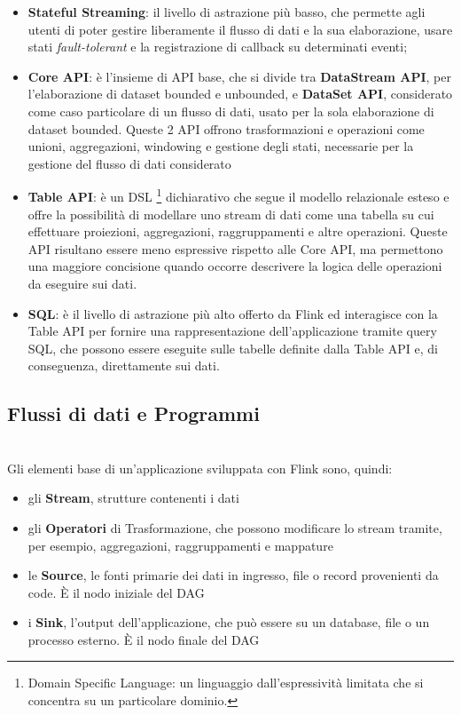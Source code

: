 \begin{itemize}
	\item \textbf{Stateful Streaming}: il livello di astrazione più basso, che permette agli utenti di poter gestire liberamente il flusso di dati e la sua elaborazione, usare stati \textit{fault-tolerant} e la registrazione di callback su determinati eventi;
	\item \textbf{Core API}: è l'insieme di API base, che si divide tra \textbf{DataStream API}, per l'elaborazione di dataset bounded e unbounded, e \textbf{DataSet API}, considerato come caso particolare di un flusso di dati, usato per la sola elaborazione di dataset bounded. Queste 2 API offrono trasformazioni e operazioni come unioni, aggregazioni, windowing e gestione degli stati, necessarie per la gestione del flusso di dati considerato
	\item \textbf{Table API}: è un DSL \footnote{Domain Specific Language: un linguaggio dall'espressività limitata che si concentra su un particolare dominio.} dichiarativo che segue il modello relazionale esteso e offre la possibilità di modellare uno stream di dati come una tabella su cui effettuare proiezioni, aggregazioni, raggruppamenti e altre operazioni. Queste API risultano essere meno espressive rispetto alle Core API, ma permettono una maggiore concisione quando occorre descrivere la logica delle operazioni da eseguire sui dati.
	\item \textbf{SQL}: è il livello di astrazione più alto offerto da Flink ed interagisce con la Table API per fornire una rappresentazione dell'applicazione tramite query SQL, che possono essere eseguite sulle tabelle definite dalla Table API e, di conseguenza, direttamente sui dati.
\end{itemize}

\subsection{Flussi di dati e Programmi}  \label{ProgramsDataflows} ~\\

Gli elementi base di un'applicazione sviluppata con Flink sono, quindi:
\begin{itemize}
	\item gli \textbf{Stream}, strutture contenenti i dati
	\item gli \textbf{Operatori} di Trasformazione, che possono modificare lo stream tramite, per esempio, aggregazioni, raggruppamenti e mappature
	\item le \textbf{Source}, le fonti primarie dei dati in ingresso, file o record provenienti da code. È il nodo iniziale del DAG
	\item i \textbf{Sink}, l'output dell'applicazione, che può essere su un database, file o un processo esterno. È il nodo finale del DAG
\end{itemize}

